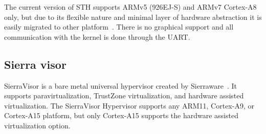 The current version of STH supports ARMv5 (926EJ-S) and ARMv7 Cortex-A8 only, but due to its flexible nature and minimal layer of hardware abstraction it is easily migrated to other platform~\cite{STH2013}. There is no graphical support and all communication with the kernel is done through the UART.\\

\subsection{Sierra visor}
SierraVisor is a bare metal universal hypervisor created by Sierraware~\cite{sierraware}. It supports paravirtualization, TrustZone virtualization, and hardware assisted virtualization. The SierraVisor Hypervisor supports any ARM11, Cortex-A9, or Cortex-A15 platform, but only Cortex-A15 supports the hardware assisted virtualization option. 

